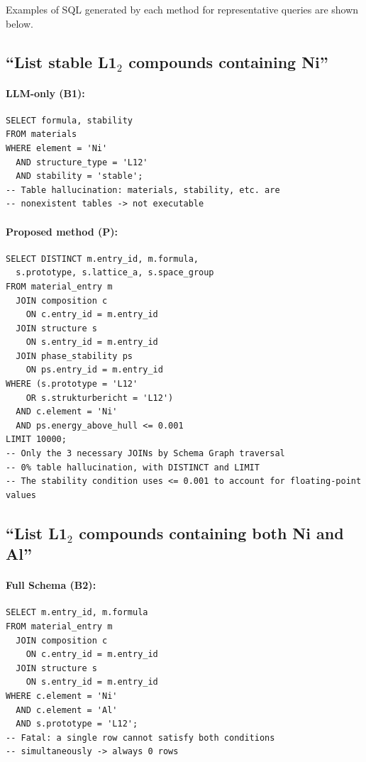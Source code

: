 \documentclass[5p,twocolumn]{elsarticle}
\begin{document}
Examples of SQL generated by each method for representative queries are shown below.

\subsection{``List stable L1$_2$ compounds containing Ni''}

\paragraph{LLM-only (B1):}
\begin{lstlisting}
SELECT formula, stability
FROM materials
WHERE element = 'Ni'
  AND structure_type = 'L12'
  AND stability = 'stable';
-- Table hallucination: materials, stability, etc. are
-- nonexistent tables -> not executable
\end{lstlisting}

\paragraph{Proposed method (P):}
\begin{lstlisting}
SELECT DISTINCT m.entry_id, m.formula,
  s.prototype, s.lattice_a, s.space_group
FROM material_entry m
  JOIN composition c
    ON c.entry_id = m.entry_id
  JOIN structure s
    ON s.entry_id = m.entry_id
  JOIN phase_stability ps
    ON ps.entry_id = m.entry_id
WHERE (s.prototype = 'L12'
    OR s.strukturbericht = 'L12')
  AND c.element = 'Ni'
  AND ps.energy_above_hull <= 0.001
LIMIT 10000;
-- Only the 3 necessary JOINs by Schema Graph traversal
-- 0% table hallucination, with DISTINCT and LIMIT
-- The stability condition uses <= 0.001 to account for floating-point values
\end{lstlisting}

\subsection{``List L1$_2$ compounds containing both Ni and Al''}

\paragraph{Full Schema (B2):}
\begin{lstlisting}
SELECT m.entry_id, m.formula
FROM material_entry m
  JOIN composition c
    ON c.entry_id = m.entry_id
  JOIN structure s
    ON s.entry_id = m.entry_id
WHERE c.element = 'Ni'
  AND c.element = 'Al'
  AND s.prototype = 'L12';
-- Fatal: a single row cannot satisfy both conditions
-- simultaneously -> always 0 rows
\end{lstlisting}
\end{document}
